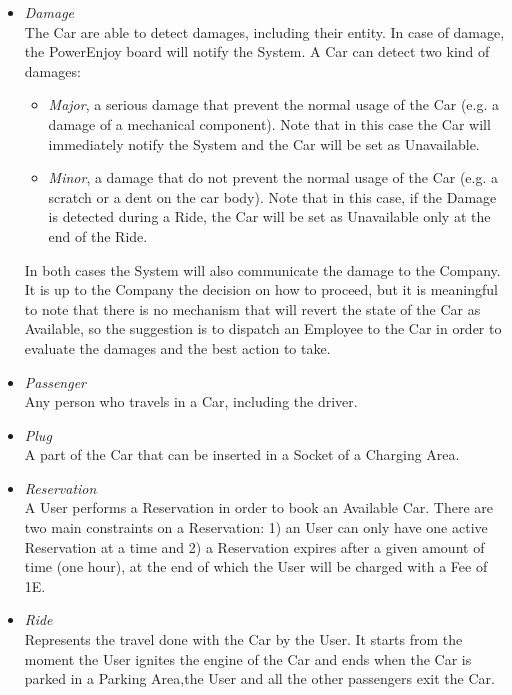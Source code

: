 \begin{itemize}
		\item \emph{Damage} \\
		The Car are able to detect damages, including their entity. In case of damage, the PowerEnjoy board will notify the System. 
		A Car can detect two kind of damages:
		\begin{itemize}
			\item \textit{Major}, a serious damage that prevent the normal usage of the Car (e.g. a damage of a mechanical component). Note that in this case the Car will immediately notify the System and the Car will be set as Unavailable.
			\item \textit{Minor}, a damage that do not prevent the normal usage of the Car (e.g. a scratch or a dent on the car body). Note that in this case, if the Damage is detected during a Ride, the Car will be set as Unavailable only at the end of the Ride.
		\end{itemize}
		In both cases the System will also communicate the damage to the Company. It is up to the Company the decision on how to proceed, but it is meaningful to note that there is no mechanism that will revert the state of the Car as Available, so the suggestion is to dispatch an Employee to the Car in order to evaluate the damages and the best action to take.
	
		\item \emph{Passenger}\\
		Any person who travels in a Car, including the driver. 
	
		\item \emph{Plug}\\
		A part of the Car that can be inserted in a Socket of a Charging Area.
	
		\item \emph{Reservation}\\
		A User performs a Reservation in order to book an Available Car. There are two main constraints on a Reservation: 1) an User can only have one active Reservation at a time and 2) a Reservation expires after a given amount of time (one hour), at the end of which the User will be charged with a Fee of 1E.

		\item \emph{Ride}\\
		Represents the travel done with the Car by the User. It starts from the moment the User ignites the engine of the Car and ends when the Car is parked in a Parking Area,the User and all the other passengers exit the Car.		
	\end{itemize}
	
